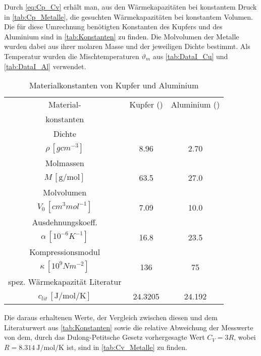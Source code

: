 	Durch \eqref{eq:Cp_Cv} erhält man, aus den Wärmekapazitäten bei konstantem Druck in \autoref{tab:Cp_Metalle}, die gesuchten 
	Wärmekapazitäten bei konstantem Volumen. Die für diese Umrechnung benötigten Konstanten des Kupfers und des Aluminium sind 
	in \autoref{tab:Konstanten} zu finden. Die Molvolumen der Metalle wurden dabei aus ihrer molaren Masse und der jeweiligen Dichte
	bestimmt. Als Temperatur wurden die Mischtemperaturen $\vartheta_{m}$ aus \autoref{tab:DataI_Cu} und \ref{tab:DataI_Al} verwendet.
	\begin{table}[!h]
		\centering
		\begin{tabular}{|c||c|c|}
			\hline
			           Material-            & Kupfer (\ce{Cu}) & Aluminium (\ce{Al}) \\
			konstanten\cite{Mende09, V206}  &                  &  \\ \hline\hline
			            Dichte              &                  &  \\
			    $\rho\,[\si{gcm^{-3}}]$     &    \num{8.96}    &     \num{2.70}      \\ \hline
			           Molmassen            &                  &  \\
			    $M\,[\si{\g\per\mol}]$      &    \num{63.5}    &     \num{27.0}      \\ \hline
			          Molvolumen            &                  &  \\
			$V_{0}\,[\si{cm^{3}mol^{-1}}]$  &    \num{7.09}    &     \num{10.0}      \\ \hline
			Ausdehnungskoeff.\footnotemark  &                  &  \\
			$\alpha\,[\si{10^{-6}K^{-1}}]$  &    \num{16.8}    &     \num{23.5}      \\ \hline
			       Kompressionsmodul        &                  &  \\
			$\kappa\,[\si{10^{9} Nm^{-2}}]$ &    \num{136}     &      \num{75}       \\ \hline
			spez. Wärmekapazität Literatur & &\\
			$c_{lit}\,[\si{\joule\per\mol\per\kelvin}]$ & \num{24.3205} & \num{24.192} \\ \hline
		\end{tabular}
		\caption{Materialkonstanten von Kupfer und Aluminium \label{tab:Konstanten}}
	\end{table}

	Die daraus erhaltenen Werte, der Vergleich zwischen diesen und dem Literaturwert aus \autoref{tab:Konstanten}
	sowie die relative Abweichung der Messwerte von dem, durch das Dulong-Petitsche Gesetz vorhergesagte Wert
	$C_{V} = 3R$, wobei $R = \SI{8.314}{\joule\per\mol\per\kelvin}$ \cite{SciPy} ist, 
	sind in \autoref{tab:Cv_Metalle} zu finden.
	
